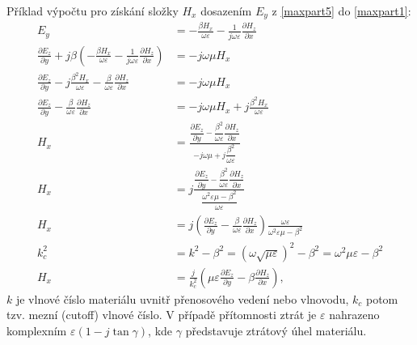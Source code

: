 \documentclass[12pt,a4paper,oneside]{article}
\numberwithin{equation}{section} %
\numberwithin{figure}{section} %
\numberwithin{table}{section} %
\begin{document}
Příklad výpočtu pro získání složky $H_x$ dosazením $E_y$ z \ref{maxpart5} do \ref{maxpart1}:
\begin{align*}
E_y &= - \frac{\beta H_x}{\omega \varepsilon} - \frac{1}{j \omega \varepsilon} \frac{\partial H_z}{\partial x}
\\
\frac{\partial E_z}{\partial y} + j \beta \left( - \frac{\beta H_x}{\omega \varepsilon} - \frac{1}{j \omega \varepsilon} \frac{\partial H_z}{\partial x} \right) &= -j \omega \mu H_x
\\
\frac{\partial E_z}{\partial y} - j \frac{\beta ^2 H_x}{\omega \varepsilon} - \frac{\beta}{\omega \varepsilon} \frac{\partial H_z}{\partial x} &= -j \omega \mu H_x
\\
\frac{\partial E_z}{\partial y} - \frac{\beta}{\omega \varepsilon} \frac{\partial H_z}{\partial x} &= -j \omega \mu H_x + j \frac{\beta ^2 H_x}{\omega \varepsilon}
\\
H_x &= \frac{\dfrac{\partial E_z}{\partial y} - \dfrac{\beta ^2}{\omega \varepsilon} \dfrac{\partial H_z}{\partial x}}{-j \omega \mu + j \dfrac{\beta ^2}{\omega \varepsilon}}
\\
H_x &= j \frac{\dfrac{\partial E_z}{\partial y} - \dfrac{\beta ^2}{\omega \varepsilon} \dfrac{\partial H_z}{\partial x}}{\dfrac{\omega ^2 \varepsilon \mu - \beta ^2}{\omega \varepsilon}}
\\
H_x &= j \left( \frac{\partial E_z}{\partial y} - \frac{\beta}{\omega \varepsilon} \frac{\partial H_z}{\partial x} \right) \frac{\omega \varepsilon}{\omega ^2 \varepsilon \mu - \beta ^2}
\\
k^2_c &= k^2 - \beta ^2 = {(\omega \sqrt{\mu \varepsilon})}^2 - \beta ^2 = \omega ^2 \mu \varepsilon - \beta ^2
\\
H_x &= \frac{j}{k^2_c} \left( \mu \varepsilon \frac{\partial E_z}{\partial y} - \beta \frac{\partial H_z}{\partial x} \right),
\end{align*}
$k$ je vlnové číslo materiálu uvnitř přenosového vedení nebo vlnovodu, $k_c$ potom tzv. mezní (cutoff) vlnové číslo. V případě přítomnosti ztrát je $\varepsilon$ nahrazeno komplexním $\varepsilon (1 - j \tan{\gamma})$, kde $\gamma$ představuje ztrátový úhel materiálu.
\end{document}
